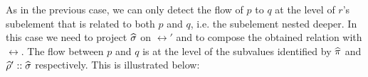 \documentclass[11pt]{article}
\begin{document}
\begin{longtable}{l@{}l@{}}
\end{longtable}

\noindent As in the previous case, we can only detect the flow of $p$ to $q$ at 
the level of $r$'s subelement that is related to both $p$ and $q$, i.e. the 
subelement nested deeper. In this case we need to project $\widehat{\sigma}$ on $\rel'$ 
and to compose the obtained relation with $\rel$. The flow between $p$ and $q$ is 
at the level of the subvalues identified by $\widehat{\pi}$ and $\widehat{\rho}'::\widehat{\sigma}$ respectively.
This is illustrated below: 
\end{document}
